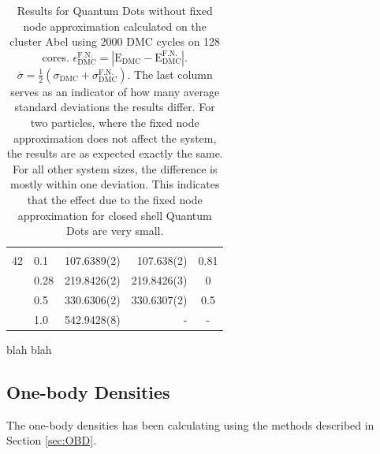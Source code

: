 \begin{table}
\begin{center}
\begin{tabular}{rl|rrc}
\cline{2-5}
\multicolumn{5}{c}{} \\
    42    &   0.1    & 107.6389(2) & 107.638(2) & 0.81 \\
          &   0.28   & 219.8426(2) & 219.8426(3)& 0 \\
          &   0.5    & 330.6306(2) & 330.6307(2)& 0.5 \\
          &   1.0    & 542.9428(8) &    -       & - \\
\hline\hline
\end{tabular}
\caption{Results for Quantum Dots without fixed node approximation calculated on the cluster Abel using $2000$ DMC cycles on 128 cores. $\epsilon_\mathrm{DMC}^\mathrm{F.N.} = |\mathrm{E_{DMC}} - \mathrm{E_{DMC}^{F.N.}}|$. $\overline{\sigma}  = \frac{1}{2}(\sigma_\mathrm{DMC} + \sigma_\mathrm{DMC}^\mathrm{F.N.})$. The last column serves as an indicator of how many average standard deviations the results differ. For two particles, where the fixed node approximation does not affect the system, the results are as expected exactly the same. For all other system sizes, the difference is mostly within one deviation. This indicates that the effect due to the fixed node approximation for closed shell Quantum Dots are very small.}
\end{center}
\end{table}

blah blah

\clearpage

\subsection{One-body Densities}

The one-body densities has been calculating using the methods described in Section \ref{sec:OBD}.


